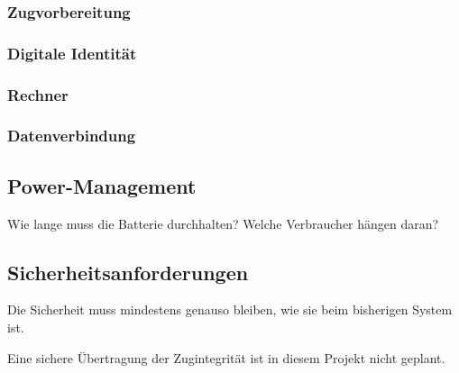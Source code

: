 \subsubsection{Zugvorbereitung}
\subsubsection{Digitale Identität}
\subsubsection{Rechner}
\subsubsection{Datenverbindung}

\subsection{Power-Management}
Wie lange muss die Batterie durchhalten? Welche Verbraucher hängen daran?


\subsection{Sicherheitsanforderungen}
Die Sicherheit muss mindestens genauso bleiben, wie sie beim bisherigen System ist.\par
Eine sichere Übertragung der Zugintegrität ist in diesem Projekt nicht geplant.

